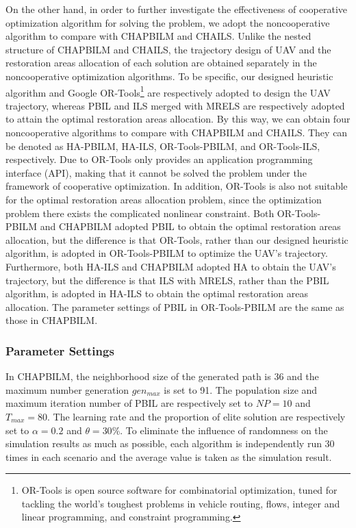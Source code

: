 \documentclass[preprint,5pt]{elsarticle}
\begin{document}
On the other hand, in order to further investigate the effectiveness of cooperative optimization algorithm for solving the problem, we adopt the noncooperative algorithm to compare with CHAPBILM and CHAILS. Unlike the nested structure of CHAPBILM and CHAILS, the trajectory design of UAV and the restoration areas allocation of each solution are obtained separately in the noncooperative optimization algorithms. To be specific, our designed heuristic algorithm and Google OR-Tools\footnote{OR-Tools is open source software for combinatorial optimization, tuned for tackling the world's toughest problems in vehicle routing, flows, integer and linear programming, and constraint programming.} \cite{OR-Tools} are respectively adopted to design the UAV trajectory, whereas PBIL and ILS merged with MRELS are respectively adopted to attain the optimal restoration areas allocation. By this way, we can obtain four noncooperative algorithms to compare with CHAPBILM and CHAILS. They can be denoted as HA-PBILM, HA-ILS, OR-Tools-PBILM, and OR-Tools-ILS, respectively. Due to OR-Tools only provides an application programming interface (API), making that it cannot be solved the problem under the framework of cooperative optimization. In addition, OR-Tools is also not suitable for the optimal restoration areas allocation problem, since the optimization problem there exists the complicated nonlinear constraint.
Both OR-Tools-PBILM and CHAPBILM adopted PBIL to obtain the optimal restoration areas allocation, but the difference is that OR-Tools, rather than our designed heuristic algorithm, is adopted in OR-Tools-PBILM to optimize the UAV's trajectory. Furthermore, both HA-ILS and CHAPBILM adopted HA to obtain the UAV's trajectory, but the difference is that ILS with MRELS, rather than the PBIL algorithm, is adopted in HA-ILS to obtain the optimal restoration areas allocation. The parameter settings of PBIL in OR-Tools-PBILM are the same as those in CHAPBILM.
\subsubsection{Parameter Settings}
In CHAPBILM, the neighborhood size of the generated path is 36 and the maximum number generation $gen_{max}$ is set to 91.
The population size and maximum iteration number of PBIL are respectively set to $NP=10$ and $T_{max}=80$. The learning rate and the proportion of elite solution are respectively set to $\alpha = 0.2$ and $\theta = 30\%$. To eliminate the influence of randomness on the simulation results as much as possible, each algorithm is independently run 30 times in each scenario and the average value is taken as the simulation result.
\end{document}
